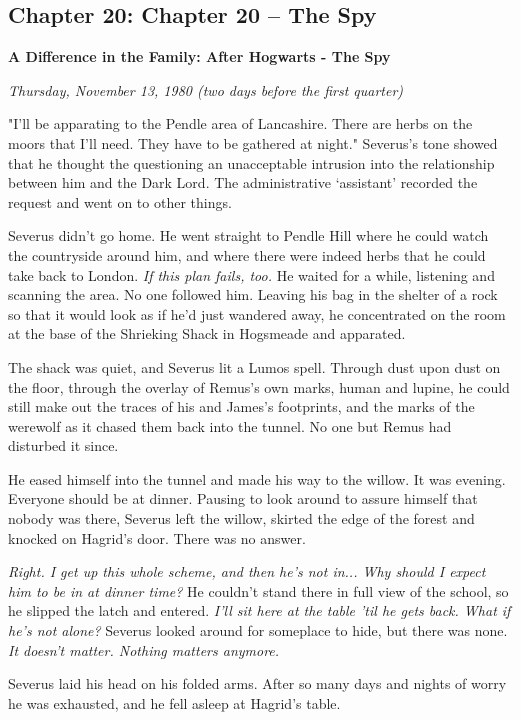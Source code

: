 \documentclass[a4paper,11pt]{article}
\begin{document}
\subsection{Chapter 20: Chapter 20 – The Spy}

\textbf{A Difference in the Family: After Hogwarts - The Spy}

\emph{Thursday, November 13, 1980 (two days before the first quarter)}

"I'll be apparating to the Pendle area of Lancashire. There are herbs on the moors that I'll need. They have to be gathered at night." Severus's tone showed that he thought the questioning an unacceptable intrusion into the relationship between him and the Dark Lord. The administrative `assistant' recorded the request and went on to other things.

Severus didn't go home. He went straight to Pendle Hill where he could watch the countryside around him, and where there were indeed herbs that he could take back to London. \emph{If this plan fails, too.} He waited for a while, listening and scanning the area. No one followed him. Leaving his bag in the shelter of a rock so that it would look as if he'd just wandered away, he concentrated on the room at the base of the Shrieking Shack in Hogsmeade and apparated.

The shack was quiet, and Severus lit a Lumos spell. Through dust upon dust on the floor, through the overlay of Remus's own marks, human and lupine, he could still make out the traces of his and James's footprints, and the marks of the werewolf as it chased them back into the tunnel. No one but Remus had disturbed it since.

He eased himself into the tunnel and made his way to the willow. It was evening. Everyone should be at dinner. Pausing to look around to assure himself that nobody was there, Severus left the willow, skirted the edge of the forest and knocked on Hagrid's door. There was no answer.

\emph{Right. I get up this whole scheme, and then he's not in... Why should I expect him to be in at dinner time?} He couldn't stand there in full view of the school, so he slipped the latch and entered. \emph{I'll sit here at the table 'til he gets back. What if he's not alone?} Severus looked around for someplace to hide, but there was none. \emph{It doesn't matter. Nothing matters anymore.}

Severus laid his head on his folded arms. After so many days and nights of worry he was exhausted, and he fell asleep at Hagrid's table.
\end{document}
